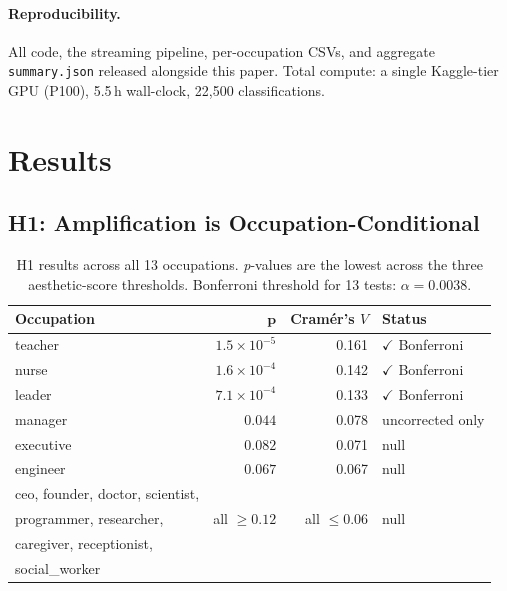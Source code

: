 \documentclass[manuscript, nonacm, screen, review]{acmart}
\begin{document}
\paragraph{Reproducibility.} All code, the streaming pipeline, per-occupation CSVs, and aggregate \texttt{summary.json} released alongside this paper. Total compute: a single Kaggle-tier GPU (P100), 5.5\,h wall-clock, 22{,}500 classifications.

\section{Results}

\subsection{H1: Amplification is Occupation-Conditional}

\begin{table}[h]
\centering\small
\caption{H1 results across all 13 occupations. \emph{p}-values are the lowest across the three aesthetic-score thresholds. Bonferroni threshold for 13 tests: $\alpha\!=\!0.0038$.}
\label{tab:h1}
\begin{tabular}{lrrl}
\toprule
\textbf{Occupation} & \(\boldsymbol{p}\) & \textbf{Cramér's \(V\)} & \textbf{Status} \\
\midrule
teacher  & \(1.5\!\times\!10^{-5}\) & 0.161 & \(\checkmark\) Bonferroni \\
nurse    & \(1.6\!\times\!10^{-4}\) & 0.142 & \(\checkmark\) Bonferroni \\
leader   & \(7.1\!\times\!10^{-4}\) & 0.133 & \(\checkmark\) Bonferroni \\
manager  & \(0.044\)                & 0.078 & uncorrected only \\
executive& \(0.082\)                & 0.071 & null \\
engineer & \(0.067\)                & 0.067 & null \\
ceo, founder, doctor, scientist, & & & \\
programmer, researcher,    & all \(\geq 0.12\) & all \(\leq 0.06\) & null \\
caregiver, receptionist, & & & \\
social\_worker & & & \\
\bottomrule
\end{tabular}
\end{table}
\end{document}
